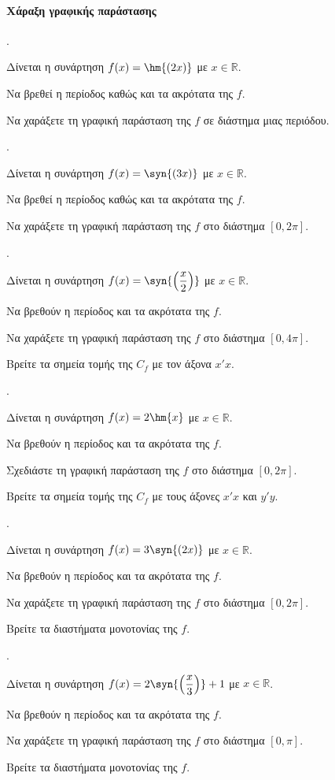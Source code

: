 \documentclass[11pt,a4paper,twocolumn]{article}
\newcounter{askhsh}
\newcommand{\askhsh}{{\large\theaskhsh.}\ \addtocounter{askhsh}{1}}
\begin{document}
\paragraph{Χάραξη γραφικής παράστασης}
\askhsh Δίνεται η συνάρτηση $f(x)=\hm{(2x)}$ με $x\in\mathbb{R}$.
\begin{alist}
\item Να βρεθεί η περίοδος καθώς και τα ακρότατα της $f$.
\item Να χαράξετε τη γραφική παράσταση της $f$ σε διάστημα μιας περιόδου.
\end{alist}
\askhsh Δίνεται η συνάρτηση $f(x)=\syn{(3x)}$ με $x\in\mathbb{R}$.
\begin{alist}
\item Να βρεθεί η περίοδος καθώς και τα ακρότατα της $f$.
\item Να χαράξετε τη γραφική παράσταση της $f$ στο διάστημα $[0,2\pi]$.
\end{alist}
\askhsh Δίνεται η συνάρτηση $f(x)=\syn{\left(\dfrac{x}{2}\right)}$ με $x\in\mathbb{R}$.
\begin{alist}
\item Να βρεθούν η περίοδος και τα ακρότατα της $f$.
\item Να χαράξετε τη γραφική παράσταση της $f$ στο διάστημα $[0,4\pi]$.
\item Βρείτε τα σημεία τομής της $C_f$ με τον άξονα $x'x$.
\end{alist}
\askhsh Δίνεται η συνάρτηση $f(x)=2\hm{x}$ με $x\in\mathbb{R}$.
\begin{alist}
\item Να βρεθούν η περίοδος και τα ακρότατα της $f$.
\item Σχεδιάστε τη γραφική παράσταση της $f$ στο διάστημα $[0,2\pi]$.
\item Βρείτε τα σημεία τομής της $C_f$ με τους άξονες $x'x$ και $y'y$.
\end{alist}
\askhsh Δίνεται η συνάρτηση $f(x)=3\syn{\left(2x\right)}$ με $x\in\mathbb{R}$.
\begin{alist}
\item Να βρεθούν η περίοδος και τα ακρότατα της $f$.
\item Να χαράξετε τη γραφική παράσταση της $f$ στο διάστημα $[0,2\pi]$.
\item Βρείτε τα διαστήματα μονοτονίας της $f$.
\end{alist}
\askhsh Δίνεται η συνάρτηση $f(x)=2\syn{\left(\dfrac{x}{3}\right)}+1$ με $x\in\mathbb{R}$.
\begin{alist}
\item Να βρεθούν η περίοδος και τα ακρότατα της $f$.
\item Να χαράξετε τη γραφική παράσταση της $f$ στο διάστημα $[0,\pi]$.
\item Βρείτε τα διαστήματα μονοτονίας της $f$.
\end{alist}
\end{document}
